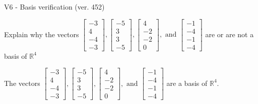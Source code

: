 \begin{exercise}
  \begin{exerciseTitle}V6 - Basis verification (ver. 452)\end{exerciseTitle}
  \begin{exerciseStatement}
    Explain why the vectors \(\left[\begin{array}{r}
-3 \\
4 \\
-4 \\
-3
\end{array}\right] , \left[\begin{array}{r}
-5 \\
3 \\
3 \\
-5
\end{array}\right] , \left[\begin{array}{r}
4 \\
-2 \\
-2 \\
0
\end{array}\right] , \text{ and } \left[\begin{array}{r}
-1 \\
-4 \\
-1 \\
-4
\end{array}\right]\) are or are not a basis of \(\mathbb{R}^4\)	


  \end{exerciseStatement}
  \begin{exerciseAnswer}
   The vectors \(\left[\begin{array}{r}
-3 \\
4 \\
-4 \\
-3
\end{array}\right] , \left[\begin{array}{r}
-5 \\
3 \\
3 \\
-5
\end{array}\right] , \left[\begin{array}{r}
4 \\
-2 \\
-2 \\
0
\end{array}\right] , \text{ and } \left[\begin{array}{r}
-1 \\
-4 \\
-1 \\
-4
\end{array}\right]\) 
  	 are  a basis of \(\mathbb{R}^4\).
  


  \end{exerciseAnswer}
\end{exercise}